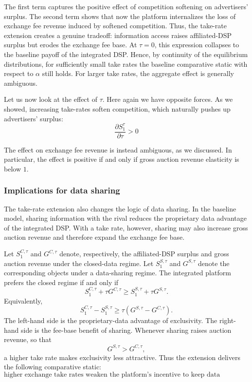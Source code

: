 \noindent The first term captures the positive effect of competition softening on advertisers' surplus. The second term shows that now the platform internalizes the loss of exchange fee revenue induced by softened competition. Thus, the take-rate extension creates a genuine tradeoff: information access raises affiliated-DSP surplus but erodes the exchange fee base. At $ \tau = 0 $, this expression collapses to the baseline payoff of the integrated DSP. Hence, by continuity of the equilibrium distributions, for sufficiently small take rates the baseline comparative static with respect to $ \alpha $ still holds. For larger take rates, the aggregate effect is generally ambiguous.

Let us now look at the effect of $ \tau $. Here again we have opposite forces. As we showed, increasing take-rates soften competition, which naturally pushes up advertisers' surplus:
\[
\frac{\partial S_1^\tau}{\partial \tau} > 0
\]

\noindent The effect on exchange fee revenue is instead ambiguous, as we discussed. In particular, the effect is positive if and only if gross auction revenue elasticity is below $ 1 $.

\subsubsection{Implications for data sharing}

The take-rate extension also changes the logic of data sharing. In the baseline model, sharing
information with the rival reduces the proprietary data advantage of the integrated DSP. With a
take rate, however, sharing may also increase gross auction revenue and therefore expand the
exchange fee base.

Let $S_1^{C,\tau}$ and $G^{C,\tau}$ denote, respectively, the affiliated-DSP surplus and gross auction
revenue under the closed-data regime. Let $S_1^{S,\tau}$ and $G^{S,\tau}$ denote the corresponding
objects under a data-sharing regime. The integrated platform prefers the closed regime if and only if
\[
S_1^{C,\tau}+\tau G^{C,\tau}
\ge
S_1^{S,\tau}+\tau G^{S,\tau}.
\]
Equivalently,
\[
S_1^{C,\tau}-S_1^{S,\tau}
\ge
\tau\left(G^{S,\tau}-G^{C,\tau}\right).
\]
The left-hand side is the proprietary-data advantage of exclusivity. The right-hand side is the
fee-base benefit of sharing. Whenever sharing raises auction revenue, so that
\[
G^{S,\tau}>G^{C,\tau},
\]
a higher take rate makes exclusivity less attractive. Thus the extension delivers the following
comparative static:
\[
\text{higher exchange take rates weaken the platform's incentive to keep data exclusive.}
\]

